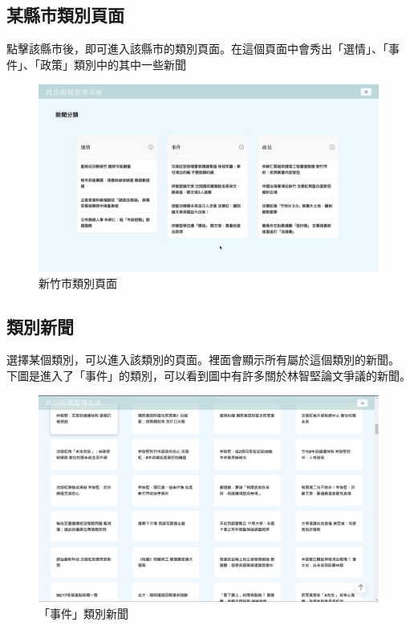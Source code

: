 \documentclass[12pt,cleanfoot,twocolumn]{asme2ej}
\begin{document}
\subsection{某縣市類別頁面}
點擊該縣市後，即可進入該縣市的類別頁面。在這個頁面中會秀出「選情」、「事件」、「政策」類別中的其中一些新聞

\begin{figure}[H]
        \includegraphics[scale=0.2]{outline}
        \caption{新竹市類別頁面}
\end{figure}

\subsection{類別新聞}
選擇某個類別，可以進入該類別的頁面。裡面會顯示所有屬於這個類別的新聞。
下圖是進入了「事件」的類別，可以看到圖中有許多關於林智堅論文爭議的新聞。

\begin{figure}[H]
        \includegraphics[scale=0.2]{event}
        \caption{「事件」類別新聞}
\end{figure}
\end{document}
